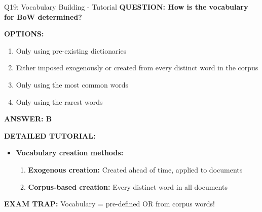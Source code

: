 \documentclass[8pt]{beamer}
\begin{document}
	\begin{frame}{Q19: Vocabulary Building - Tutorial}
		\fontsize{6.5}{7.5}\selectfont
		\textbf{QUESTION: How is the vocabulary for BoW determined?}
		
		\vspace{0.1cm}
		\textbf{OPTIONS:}
		\begin{enumerate}
			\item Only using pre-existing dictionaries
			\item Either imposed exogenously or created from every distinct word in the corpus
			\item Only using the most common words
			\item Only using the rarest words
		\end{enumerate}
		
		\vspace{0.1cm}
		\textcolor{myblue}{\textbf{ANSWER: B}}
		
		\vspace{0.1cm}
		\textbf{DETAILED TUTORIAL:}
		\begin{itemize}
			\item \textbf{Vocabulary creation methods:}
			\begin{enumerate}
				\item \textbf{Exogenous creation:} Created ahead of time, applied to documents
				\item \textbf{Corpus-based creation:} Every distinct word in all documents
			\end{enumerate}
		\end{itemize}
		
		\textcolor{myred}{\textbf{EXAM TRAP:}} Vocabulary = \textcolor{myblue}{pre-defined OR from corpus words}!
	\end{frame}
	
\end{document}
